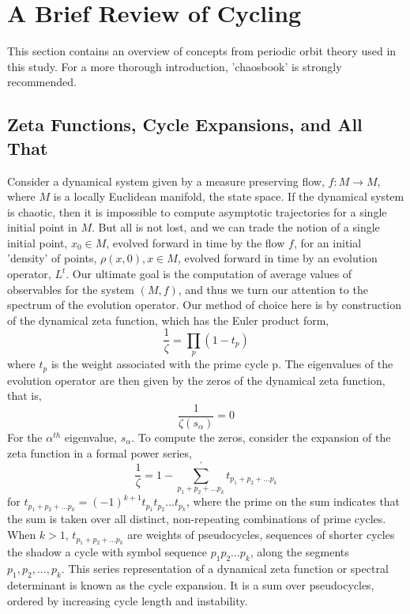 \documentclass[twocolumn,aip,cha]{revtex4-1}
\begin{document}
\section{A Brief Review of Cycling}
This section contains an overview of concepts from periodic orbit theory used in this study. For a more thorough introduction, 'chaosbook' is strongly recommended.
\subsection{Zeta Functions, Cycle Expansions, and All That}
Consider a dynamical system given by a measure preserving flow, $f: M\rightarrow M$, where $M$ is a locally Euclidean manifold, the state space. If the dynamical system is chaotic, then it is impossible to compute asymptotic trajectories for a single initial point in $M$. But all is not lost, and we can trade the notion of a single initial point, $x_{0}\in M$, evolved forward in time by the flow $f$, for an initial 'density' of points, $\rho (x, 0), x\in M$, evolved forward in time by an evolution operator, $L^{t}$.
\indent Our ultimate goal is the computation of average values of observables for the system $(M, f)$, and thus we turn our attention to the spectrum of the evolution operator. Our method of choice here is by construction of the dynamical zeta function, which has the Euler product form,
\begin{equation}
\frac{1}{\zeta} = \prod_{p} (1 - t_{p})
\end{equation}
where $t_{p}$ is the weight associated with the prime cycle p. The eigenvalues of the evolution operator are then given by the zeros of the dynamical zeta function, that is,
\begin{equation}
\frac{1}{\zeta (s_{\alpha})} = 0
\end{equation}
For the $\alpha^{th}$ eigenvalue, $s_{\alpha}$. To compute the zeros, consider the expansion of the zeta function in a formal power series,
\begin{equation}
\frac{1}{\zeta} = 1 - \sum_{p_{1}+p_{2}+...p_{k}}^{'}t_{p_{1}+p_{2}+...p_{k}}
\end{equation}
for $t_{p_{1}+p_{2}+...p_{k}} = (-1)^{k+1}t_{p_{1}}t_{p_{2}}...t_{p_{k}}$, where the prime on the sum indicates that the sum is taken over all distinct, non-repeating combinations of prime cycles. When $k>1$, $t_{p_{1}+p_{2}+...p_{k}}$ are weights of pseudocycles, sequences of shorter cycles the shadow a cycle with symbol sequence $p_{1}p_{2}...p_{k}$, along the segments $p_{1}, p_{2}, ..., p_{k}$. This series representation of a dynamical zeta function or spectral determinant is known as the cycle expansion. It is a sum over pseudocycles, ordered by increasing cycle length and instability.
\end{document}
